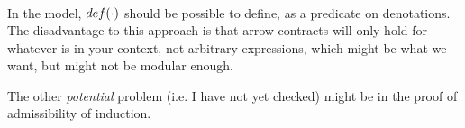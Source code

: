 \documentclass[preprint,nocopyrightspace]{sigplanconf}
\begin{document}
\[\begin{array}{lll}
\end{array}\]


In the model, ${\mathop{def}}(\cdot)$ should be possible to define, as a
predicate on denotations. The disadvantage to this approach is that
arrow contracts will only hold for whatever is in your context, not
arbitrary expressions, which might be what we want, but might not be
modular enough.

The other {\em potential} problem (i.e. I have not yet checked) might be in the 
proof of admissibility of induction. 




\end{document}

